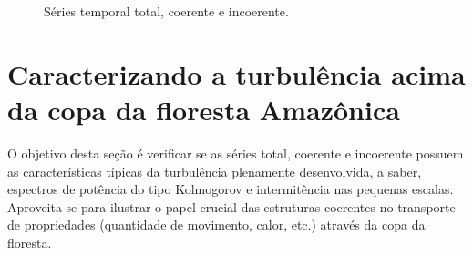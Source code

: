 \begin{figure}[ht]
	\caption{Séries temporal total, coerente e incoerente.}
	\vspace{0mm}	%
	\begin{center}
	\end{center}
	\vspace{-2mm}	%
	\label{figfiltrotS0681200}
\end{figure}

\section{Caracterizando a turbulência acima da copa da floresta Amazônica}

O objetivo desta seção é verificar se as séries total, coerente e incoerente possuem as características típicas da turbulência plenamente desenvolvida, a saber, espectros de potência do tipo Kolmogorov e intermitência nas pequenas escalas. Aproveita-se para ilustrar o papel crucial das estruturas coerentes no transporte de propriedades (quantidade de movimento, calor, etc.) através da copa da floresta.

